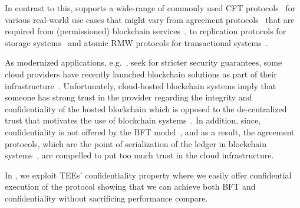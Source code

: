 In contrast to this, \projecttitle{} supports a wide-range of commonly used CFT protocols~\cite{} for various real-world use cases that might vary from agreement protocols~\cite{} that are required from (permissioned) blockchain services~\cite{}, to replication protocols for storage systems~\cite{} and atomic RMW protocols for transactional systems~\cite{}. 



 As modernized applications, e.g.~\cite{10.1093/jamia/ocx068}, seek for stricter security guarantees, some cloud providers have recently launched blockchain solutions as part of their infrastructure~\cite{}. Unfortunately, cloud-hosted blockchain systems imply that someone has strong trust in the provider regarding the integrity and confidentiality of the hosted blockchain which is opposed to the de-centralized trust that motivates the use of blockchain systems~\cite{10.1145/3528535.3531516}. In addition, since, confidentiality is not offered by the BFT model~\cite{ciad}, and as a result, the agreement protocols, which are the point of serialization of the ledger in blockchain systems~\cite{}, are compelled to put too much trust in the cloud infrastructure. 

In \projecttitle{}, we exploit TEEs' confidentiality property where we easily offer confidential execution of the protocol showing that we can achieve both BFT and confidentiality without sacrificing performance compare.
\fi






